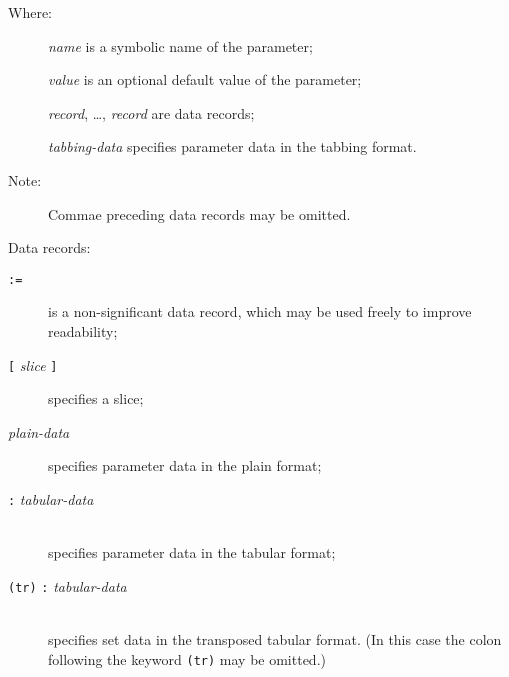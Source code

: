 \documentclass[10pt]{article}
\begin{document}
\newpage

\setlength{\leftmargini}{60pt}

\begin{description}
\item[{\rm Where:}\hspace*{23pt}] {\it name} is a symbolic name of the
parameter;
\item[\hspace*{54pt}] {\it value} is an optional default value of the
parameter;
\item[\hspace*{54pt}] {\it record}, \dots, {\it record} are data
records;
\item[\hspace*{54pt}] {\it tabbing-data} specifies parameter data in
the tabbing format.
\end{description}

\begin{description}
\item[{\rm Note:}\hspace*{31pt}] Commae preceding data records may be
omitted.
\end{description}

\noindent Data records:

\begin{description}
\item[{\tt :=}\hspace*{45pt}] is a non-significant data record, which
may be used freely to improve readability;
\item[{\tt[} {\it slice} {\tt]}\hspace*{18.5pt}] specifies a slice;
\item[{\it plain-data}\hspace*{11pt}] specifies parameter data in the
plain format;
\item[{\tt:} {\it tabular-data}]\hspace*{0pt}\\
specifies parameter data in the tabular format;
\item[{\tt(tr)} {\tt:} {\it tabular-data}]\hspace*{0pt}\\
specifies set data in the transposed tabular format. (In this case the
colon following the keyword {\tt(tr)} may be omitted.)
\end{description}

\end{document}
